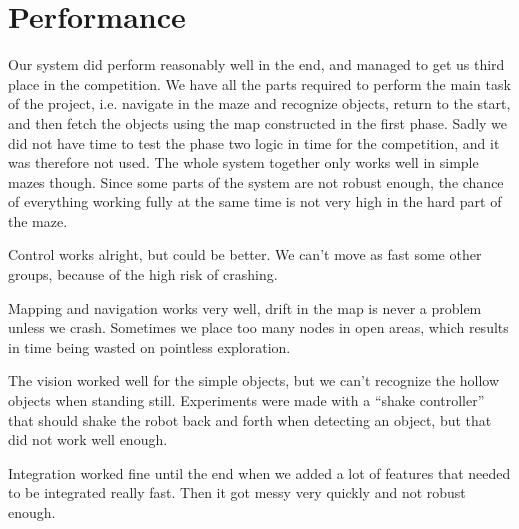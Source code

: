\section{Performance}
Our system did perform reasonably well in the end, and managed to get us third place in the competition. 
We have all the parts required to perform the main task of the project, i.e. navigate in the maze and recognize objects, return to the start, and then fetch the objects using the map constructed in the first phase. 
Sadly we did not have time to test the phase two logic in time for the competition, and it was therefore not used.
The whole system together only works well in simple mazes though. 
Since some parts of the system are not robust enough, the chance of everything working fully at the same time is not very high in the hard part of the maze. 

Control works alright, but could be better. 
We can't move as fast some other groups, because of the high risk of crashing. 

Mapping and navigation works very well, drift in the map is never a problem unless we crash. Sometimes we place too many nodes in open areas, which results in time being wasted on pointless exploration.

The vision worked well for the simple objects, but we can't recognize the hollow objects when standing still. 
Experiments were made with a ``shake controller'' that should shake the robot back and forth when detecting an object, but that did not work well enough.

Integration worked fine until the end when we added a lot of features that needed to be integrated really fast. Then it got messy very quickly and not robust enough.